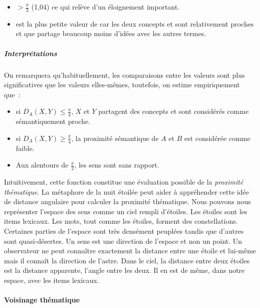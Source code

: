{\begin{itemize}
\item{} $> \frac{\pi}{3}$
  (1,04) ce qui relève d'un éloignement important.
  
\item {} est la plus petite
  valeur de  car les deux concepts
   et  sont relativement proches et que
   partage beaucoup moins d'idées avec les autres
  termes.
\end{itemize}

\subparagraph{Interprétations}
 

On remarquera qu'habituellement, les comparaisons entre les valeurs
sont plus significatives que les valeurs elles-mêmes, toutefois, on
estime empiriquement que~:
\begin{itemize}
\item si $D_{A}(X,Y) \leq \frac{\pi}{4}$, $X$ et $Y$ partagent des
  concepts et sont considérés comme sémantiquement proche.
\item si $D_{A}(X,Y) \geq \frac{\pi}{4}$, la proximité sémantique de
  $A$ et $B$ est considérée comme faible.
\item Aux alentours de $\frac{\pi}{2}$, les sens sont sans rapport.
\end{itemize}

Intuitivement, cette fonction constitue une évaluation possible de la
\emph{proximité thématique}.  La métaphore de la nuit étoilée peut
aider à appréhender cette idée de distance angulaire pour calculer la
proximité thématique. Nous pouvons nous représenter l'espace des sens
comme un ciel rempli d'étoiles. Les étoiles sont les items lexicaux.
Les mots, tout comme les étoiles, forment des constellations.
Certaines parties de l'espace sont très densément peuplées tandis que
d'autres sont quasi-désertes. Un sens est une direction de l'espace et
non un point. Un observateur ne peut connaître exactement la distance
entre une étoile et lui-même mais il connaît la direction de l'astre.
Dans le ciel, la distance entre deux étoiles est la distance
apparente, l'angle entre les deux. Il en est de même, dans notre
espace, avec les items lexicaux.

\paragraph{Voisinage thématique}\label{sec:voisinage}
 

}
